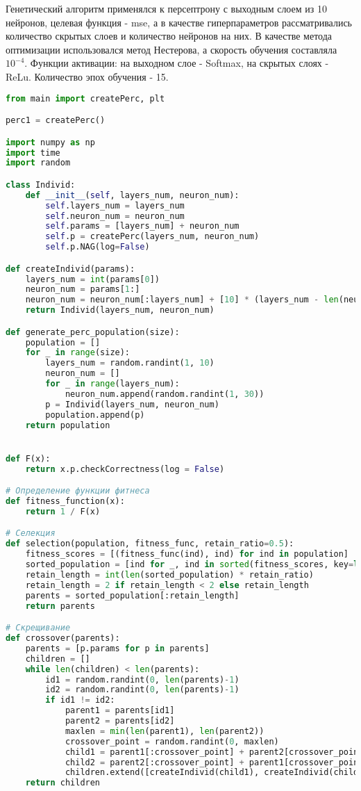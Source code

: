 \documentclass[a4paper, 14pt]{extarticle}
\begin{document}
Генетический алгоритм применялся к персептрону с выходным слоем из 10 нейронов, целевая функция - mse, а  в качестве гиперпараметров рассматривались количество скрытых слоев и количество нейронов на них. В качестве метода оптимизации использовался метод Нестерова, а скорость обучения составляла $10^{-4}$. Функции активации: на выходном слое - Softmax, на скрытых слоях - ReLu. Количество эпох обучения - 15.

\begin{lstlisting}[language=Python,caption={gen.py},label={lst:code3}]
from main import createPerc, plt

perc1 = createPerc()

import numpy as np
import time
import random

class Individ:
    def __init__(self, layers_num, neuron_num):
        self.layers_num = layers_num
        self.neuron_num = neuron_num
        self.params = [layers_num] + neuron_num
        self.p = createPerc(layers_num, neuron_num)
        self.p.NAG(log=False)

def createIndivid(params):
    layers_num = int(params[0])
    neuron_num = params[1:]
    neuron_num = neuron_num[:layers_num] + [10] * (layers_num - len(neuron_num))
    return Individ(layers_num, neuron_num)

def generate_perc_population(size):
    population = []
    for _ in range(size):
        layers_num = random.randint(1, 10)
        neuron_num = []
        for _ in range(layers_num):
            neuron_num.append(random.randint(1, 30))
        p = Individ(layers_num, neuron_num)
        population.append(p)
    return population


def F(x):
    return x.p.checkCorrectness(log = False)

# Определение функции фитнеса
def fitness_function(x):
    return 1 / F(x)

# Селекция
def selection(population, fitness_func, retain_ratio=0.5):
    fitness_scores = [(fitness_func(ind), ind) for ind in population]
    sorted_population = [ind for _, ind in sorted(fitness_scores, key=lambda x: x[0])]
    retain_length = int(len(sorted_population) * retain_ratio)
    retain_length = 2 if retain_length < 2 else retain_length
    parents = sorted_population[:retain_length]
    return parents

# Скрещивание
def crossover(parents):
    parents = [p.params for p in parents]
    children = []
    while len(children) < len(parents):
        id1 = random.randint(0, len(parents)-1)
        id2 = random.randint(0, len(parents)-1)
        if id1 != id2:
            parent1 = parents[id1]
            parent2 = parents[id2]
            maxlen = min(len(parent1), len(parent2))
            crossover_point = random.randint(0, maxlen)
            child1 = parent1[:crossover_point] + parent2[crossover_point:]
            child2 = parent2[:crossover_point] + parent1[crossover_point:]
            children.extend([createIndivid(child1), createIndivid(child2)])
    return children


\end{lstlisting}
\end{document}

